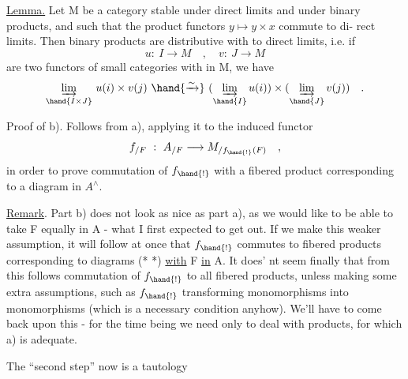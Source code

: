 
\uline{Lemma.} Let M be a category stable under direct limits and under binary
products, and such that the product functors $y\mapsto y\times x$ commute to di-%
rect limits. Then binary products are distributive with  to
direct limits, i.e. if
\[ u:\ I\to M \quad , \quad v:\ J\to M \]
are two functors of small categories with  in M, we have
\[ \underset{\hand{I\times J}}{\varinjlim}\ u(i)\times v(j)\ \hand{\xrightarrow{\sim}}\ (\underset{\hand{I}}{\varinjlim}\, u(i))\times(\underset{\hand{J}}{\varinjlim}\, v(j)) \quad . \]

Proof of b). Follows from a), applying it to the induced functor
\[ f_{/F}\ :\ A_{/F}\longrightarrow M_{/f_{\hand{!}}(F)} \quad , \]
in order to prove commutation of $f_{\hand{!}}$ with a fibered product corresponding
to a diagram
in $A^\wedge$.

\uline{Remark}. Part b) does not look as nice as part a), as we would like to
be able to take F equally in A - what I first expected to get out. If
we make  this weaker assumption, it will follow at once that $f_{\hand{!}}$ commutes
to fibered products corresponding to diagrams (* *) \uline{with} F \uline{in} A. It does'
nt seem finally that from this follows commutation of $f_{\hand{!}}$ to all fibered
products, unless making some extra assumptions, such as $f_{\hand{!}}$ transforming
monomorphisms into monomorphisms (which is a necessary condition anyhow).
We'll have to come back upon this - for the time being we need only to 
deal with products, for which a) is adequate.

The ``second step'' now is a tautology\hand{:} 

